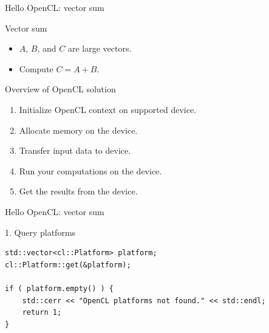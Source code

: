 \documentclass[@BEAMER_OPTIONS@]{beamer}
\begin{document}
\begin{frame}[fragile]{Hello OpenCL: vector sum}
    \begin{block}{Vector sum}
        \begin{itemize}
            \item $A$, $B$, and $C$ are large vectors.
            \item Compute $C = A + B$.
        \end{itemize}
    \end{block}
    \begin{block}{Overview of OpenCL solution}
        \begin{enumerate}
            \item Initialize OpenCL context on supported device.
            \item Allocate memory on the device.
            \item Transfer input data to device.
            \item Run your computations on the device.
            \item Get the results from the device.
        \end{enumerate}
    \end{block}
\end{frame}


\begin{frame}[fragile]{Hello OpenCL: vector sum}
    \begin{exampleblock}{1. Query platforms}
        \begin{lstlisting}
std::vector<cl::Platform> platform;
cl::Platform::get(&platform);

if ( platform.empty() ) {
    std::cerr << "OpenCL platforms not found." << std::endl;
    return 1;
}
        \end{lstlisting}
    \end{exampleblock}
\end{frame}
\end{document}
